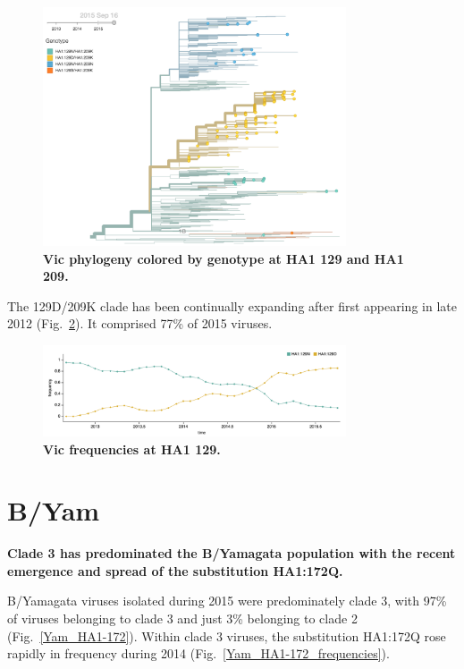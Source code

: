 \documentclass[11pt,oneside,letterpaper]{article}
\begin{document}
\begin{figure}[h!]
	\centering		
	\includegraphics[width=0.8\textwidth]{../figures/sep-2015/Vic_HA1-129_HA1-209.png}
	\caption{\textbf{Vic phylogeny colored by genotype at HA1 129 and HA1 209.} 
	}
	\label{Vic_HA1-129_HA1-209}
\end{figure}

The 129D/209K clade has been continually expanding after first appearing in late 2012 (Fig.~\ref{Vic_frequencies}). It comprised 77\% of 2015 viruses.

\begin{figure}[h!]
	\centering		
	\includegraphics[width=0.8\textwidth]{../figures/sep-2015/Vic_frequencies.png}
	\caption{\textbf{Vic frequencies at HA1 129.} 
	}
	\label{Vic_frequencies}
\end{figure}

\clearpage
\pagebreak

\section*{B/Yam}

\textbf{Clade 3 has predominated the B/Yamagata population with the recent emergence and spread of the substitution HA1:172Q.}

B/Yamagata viruses isolated during 2015 were predominately clade 3, with 97\% of viruses belonging to clade 3 and just 3\% belonging to clade 2 (Fig.~\ref{Yam_HA1-172}). Within clade 3 viruses, the substitution HA1:172Q rose rapidly in frequency during 2014 (Fig.~\ref{Yam_HA1-172_frequencies}).
\end{document}
